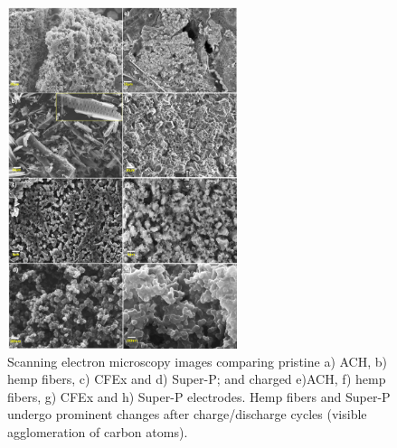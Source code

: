 \begin{figure}[tbh!]
  \centering
  \includegraphics[width=0.6\textwidth]{Figures/chap5fig/SEM}
    \caption{Scanning electron microscopy images comparing pristine a) ACH, b) hemp fibers, c) CFEx and d) Super-P; and charged e)ACH, f) hemp fibers, g) CFEx and h) Super-P electrodes. Hemp fibers and Super-P undergo prominent changes after charge/discharge cycles (visible agglomeration of carbon atoms).}
  \label{Figures/chap5fig:SEM}
\end{figure}

